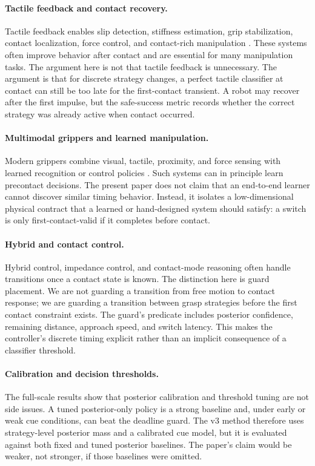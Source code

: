 \documentclass{article}
\begin{document}
\paragraph{Tactile feedback and contact recovery.}
Tactile feedback enables slip detection, stiffness estimation, grip stabilization, contact localization, force control, and contact-rich manipulation \citep{rw001,rw003,rw008,rw010,rw012,rw014,rw025,rw037,rw041,rw043,rw044,rw045}. These systems often improve behavior after contact and are essential for many manipulation tasks. The argument here is not that tactile feedback is unnecessary. The argument is that for discrete strategy changes, a perfect tactile classifier at contact can still be too late for the first-contact transient. A robot may recover after the first impulse, but the safe-success metric records whether the correct strategy was already active when contact occurred.

\paragraph{Multimodal grippers and learned manipulation.}
Modern grippers combine visual, tactile, proximity, and force sensing with learned recognition or control policies \citep{rw005,rw006,rw009,rw013,rw017,rw018,rw019,rw023,rw029,rw032,rw033,rw034,rw038,rw042}. Such systems can in principle learn precontact decisions. The present paper does not claim that an end-to-end learner cannot discover similar timing behavior. Instead, it isolates a low-dimensional physical contract that a learned or hand-designed system should satisfy: a switch is only first-contact-valid if it completes before contact.

\paragraph{Hybrid and contact control.}
Hybrid control, impedance control, and contact-mode reasoning often handle transitions once a contact state is known. The distinction here is guard placement. We are not guarding a transition from free motion to contact response; we are guarding a transition between grasp strategies before the first contact constraint exists. The guard's predicate includes posterior confidence, remaining distance, approach speed, and switch latency. This makes the controller's discrete timing explicit rather than an implicit consequence of a classifier threshold.

\paragraph{Calibration and decision thresholds.}
The full-scale results show that posterior calibration and threshold tuning are not side issues. A tuned posterior-only policy is a strong baseline and, under early or weak cue conditions, can beat the deadline guard. The v3 method therefore uses strategy-level posterior mass and a calibrated cue model, but it is evaluated against both fixed and tuned posterior baselines. The paper's claim would be weaker, not stronger, if those baselines were omitted.
\end{document}
